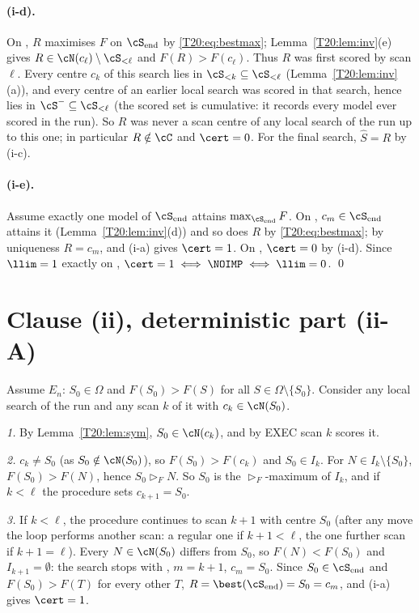 \documentclass[11pt]{report}
\begin{document}
\paragraph{(i-d).}
On \LIMIT, $R$ maximises $F$ on $\cS_{\rm end}$ by \eqref{T20:eq:bestmax}; Lemma~\ref{T20:lem:inv}(e) gives $R\in\cN(c_\ell)\setminus\cS_{<\ell}$ and $F(R)>F(c_\ell)$. Thus $R$ was first scored by scan $\ell$. Every centre $c_k$ of this search lies in $\cS_{<k}\subseteq\cS_{<\ell}$ (Lemma~\ref{T20:lem:inv}(a)), and every centre of an earlier local search was scored in that search, hence lies in $\cS^-\subseteq\cS_{<\ell}$ (the scored set is cumulative: it records every model ever scored in the run). So $R$ was never a scan centre of any local search of the run up to this one; in particular $R\notin\cC$ and $\cert=0$. For the final search, $\hat S=R$ by (i-c).

\paragraph{(i-e).}
Assume exactly one model of $\cS_{\rm end}$ attains $\max_{\cS_{\rm end}}F$. On \NOIMP, $c_m\in\cS_{\rm end}$ attains it (Lemma~\ref{T20:lem:inv}(d)) and so does $R$ by \eqref{T20:eq:bestmax}; by uniqueness $R=c_m$, and (i-a) gives $\cert=1$. On \LIMIT, $\cert=0$ by (i-d). Since $\llim=1$ exactly on \LIMIT, $\cert=1\iff\NOIMP\iff\llim=0$. \qed

\section{Clause (ii), deterministic part (ii-A)}

Assume $E_n$: $S_0\in\Omega$ and $F(S_0)>F(S)$ for all $S\in\Omega\setminus\{S_0\}$. Consider any local search of the run and any scan $k$ of it with $c_k\in\cN(S_0)$.

\emph{1.} By Lemma~\ref{T20:lem:sym}, $S_0\in\cN(c_k)$, and by EXEC scan $k$ scores it.

\emph{2.} $c_k\ne S_0$ (as $S_0\notin\cN(S_0)$), so $F(S_0)>F(c_k)$ and $S_0\in I_k$. For $N\in I_k\setminus\{S_0\}$, $F(S_0)>F(N)$, hence $S_0\rhd_F N$. So $S_0$ is the $\rhd_F$-maximum of $I_k$, and if $k<\ell$ the procedure sets $c_{k+1}=S_0$.

\emph{3.} If $k<\ell$, the procedure continues to scan $k+1$ with centre $S_0$ (after any move the loop performs another scan: a regular one if $k+1<\ell$, the one further scan if $k+1=\ell$). Every $N\in\cN(S_0)$ differs from $S_0$, so $F(N)<F(S_0)$ and $I_{k+1}=\emptyset$: the search stops with \NOIMP, $m=k+1$, $c_m=S_0$. Since $S_0\in\cS_{\rm end}$ and $F(S_0)>F(T)$ for every other $T$, $R=\best(\cS_{\rm end})=S_0=c_m$, and (i-a) gives $\cert=1$.
\end{document}
